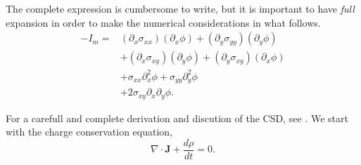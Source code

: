 \documentclass{article}
\newcommand{\Jd}{\mathbf{J}}
\begin{document}
The complete expression is cumbersome to write, but it is important to
have \emph{full} expansion in order to make the numerical considerations
in what follows.
\begin{equation}
  \begin{split}
  -I_m= & (\partial_x \sigma_{xx}) (\partial_x \phi) +
  (\partial_y \sigma_{yy}) (\partial_y \phi)\\
& +(\partial_x \sigma_{xy}) (\partial_y \phi) +(\partial_y \sigma_{xy}) (\partial_x \phi)\\
& + \sigma_{xx} \partial_x^2 \phi + \sigma_{yy} \partial_y^2 \phi\\
& + 2\sigma_{xy} \partial_x\partial_y \phi. 
\end{split}
 \end{equation}
  




For a carefull and complete derivation and discution of the CSD, 
see \cite{Bedard11}. We start with the charge conservation equation,
\begin{equation}
\nabla \cdot \Jd + \frac{d \rho}{d t} =0.
\end{equation}
\end{document}
